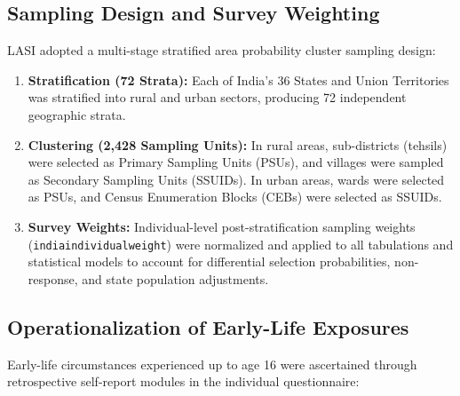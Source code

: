\subsection{Sampling Design and Survey Weighting}
LASI adopted a multi-stage stratified area probability cluster sampling design:
\begin{enumerate}[label=\alph*.]
    \item \textbf{Stratification (72 Strata):} Each of India's 36 States and Union Territories was stratified into rural and urban sectors, producing 72 independent geographic strata.
    \item \textbf{Clustering (2,428 Sampling Units):} In rural areas, sub-districts (tehsils) were selected as Primary Sampling Units (PSUs), and villages were sampled as Secondary Sampling Units (SSUIDs). In urban areas, wards were selected as PSUs, and Census Enumeration Blocks (CEBs) were selected as SSUIDs.
    \item \textbf{Survey Weights:} Individual-level post-stratification sampling weights (\texttt{indiaindividualweight}) were normalized and applied to all tabulations and statistical models to account for differential selection probabilities, non-response, and state population adjustments.
\end{enumerate}

\subsection{Operationalization of Early-Life Exposures}
Early-life circumstances experienced up to age 16 were ascertained through retrospective self-report modules in the individual questionnaire:

